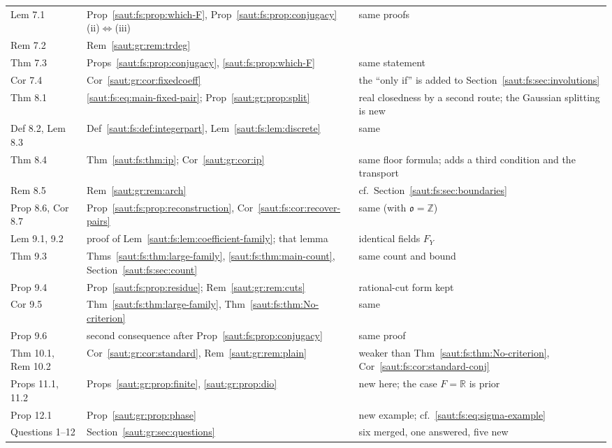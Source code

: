 \documentclass[11pt]{article}
\theoremstyle{definition}
\theoremstyle{remark}
\newcommand{\R}{\mathbb R}
\newcommand{\Z}{\mathbb Z}
\numberwithin{equation}{section}
\begin{document}
\begin{center}
\begin{longtable}{@{}>{\RaggedRight\arraybackslash}p{}>{\RaggedRight\arraybackslash}p{}>{\RaggedRight\arraybackslash}p{}@{}}
Lem 7.1 & Prop~\ref{saut:fs:prop:which-F}, Prop~\ref{saut:fs:prop:conjugacy}(ii)$\Leftrightarrow$(iii) & same proofs\\
Rem 7.2 & Rem~\ref{saut:gr:rem:trdeg} & \\
Thm 7.3 & Props~\ref{saut:fs:prop:conjugacy}, \ref{saut:fs:prop:which-F} & same statement\\
Cor 7.4 & Cor~\ref{saut:gr:cor:fixedcoeff} & the ``only if'' is added to Section~\ref{saut:fs:sec:involutions}\\
Thm 8.1 & \eqref{saut:fs:eq:main-fixed-pair}; Prop~\ref{saut:gr:prop:split} & real closedness by a second route; the Gaussian splitting is new\\
Def 8.2, Lem 8.3 & Def~\ref{saut:fs:def:integerpart}, Lem~\ref{saut:fs:lem:discrete} & same\\
Thm 8.4 & Thm~\ref{saut:fs:thm:ip}; Cor~\ref{saut:gr:cor:ip} & same floor formula; adds a third condition and the transport\\
Rem 8.5 & Rem~\ref{saut:gr:rem:arch} & cf.\ Section~\ref{saut:fs:sec:boundaries}\\
Prop 8.6, Cor 8.7 & Prop~\ref{saut:fs:prop:reconstruction}, Cor~\ref{saut:fs:cor:recover-pairs} & same (with $\mathfrak o=\Z$)\\
Lem 9.1, 9.2 & proof of Lem~\ref{saut:fs:lem:coefficient-family}; that lemma & identical fields $F_Y$\\
Thm 9.3 & Thms~\ref{saut:fs:thm:large-family}, \ref{saut:fs:thm:main-count}, Section~\ref{saut:fs:sec:count} & same count and bound\\
Prop 9.4 & Prop~\ref{saut:fs:prop:residue}; Rem~\ref{saut:gr:rem:cuts} & rational-cut form kept\\
Cor 9.5 & Thm~\ref{saut:fs:thm:large-family}, Thm~\ref{saut:fs:thm:No-criterion} & same\\
Prop 9.6 & second consequence after Prop~\ref{saut:fs:prop:conjugacy} & same proof\\
Thm 10.1, Rem 10.2 & Cor~\ref{saut:gr:cor:standard}, Rem~\ref{saut:gr:rem:plain} & weaker than Thm~\ref{saut:fs:thm:No-criterion}, Cor~\ref{saut:fs:cor:standard-conj}\\
Props 11.1, 11.2 & Props~\ref{saut:gr:prop:finite}, \ref{saut:gr:prop:dio} & new here; the case $F=\R$ is prior\\
Prop 12.1 & Prop~\ref{saut:gr:prop:phase} & new example; cf.\ \eqref{saut:fs:eq:sigma-example}\\
Questions 1--12 & Section~\ref{saut:gr:sec:questions} & six merged, one answered, five new\\
\bottomrule
\end{longtable}
\end{center}
\end{document}
